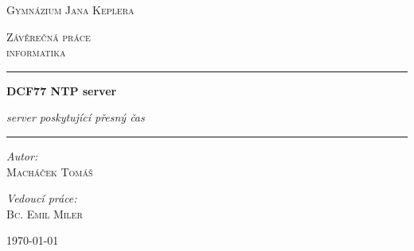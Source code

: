 \begin{titlepage}
    \begin{center}
        \vspace*{.06\textheight}

        \LARGE

        \textsc{Gymnázium Jana Keplera}

        \vspace{1.5cm}

        \Large

        \textsc{Závěrečná práce\\
        informatika}

        \vspace{1.5cm}

        \hrule

        \vspace{0.8cm}

        \LARGE
        \textbf{DCF77 NTP server}

        \vspace{0.2cm}
        \Large
        \emph{server poskytující přesný čas}

        \vspace{0.8cm}

        \hrule
        \vspace{2cm}

        \begin{minipage}[c]{0.4\textwidth}
            \begin{flushleft} \large
                \emph{Autor:}\\
                \textsc{Macháček Tomáš}
            \end{flushleft}
        \end{minipage}
        \begin{minipage}[c]{0.4\textwidth}
            \begin{flushright} \large
                \emph{Vedoucí práce:} \\
                \textsc{Bc. Emil Miler}
            \end{flushright}
        \end{minipage}

        \vspace{8cm}

        \today

        \vfill

    \end{center}
\end{titlepage}
